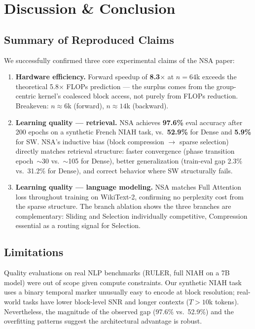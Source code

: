 \documentclass[10pt,twocolumn]{article}
\begin{document}
\FloatBarrier
\section{Discussion \& Conclusion}

\subsection{Summary of Reproduced Claims}

We successfully confirmed three core experimental claims of the NSA paper:

\begin{enumerate}[leftmargin=*,noitemsep,topsep=3pt]
\item \textbf{Hardware efficiency.}
  Forward speedup of \textbf{8.3$\times$} at $n=64$k exceeds the theoretical
  5.8$\times$ FLOPs prediction — the surplus comes from the group-centric kernel's
  coalesced block access, not purely from FLOPs reduction.
  Breakeven: $n \approx 6$k (forward), $n \approx 14$k (backward).

\item \textbf{Learning quality — retrieval.}
  NSA achieves \textbf{97.6\%} eval accuracy after 200 epochs on a synthetic
  French NIAH task, vs.\ \textbf{52.9\%} for Dense and \textbf{5.9\%} for SW.
  NSA's inductive bias (block compression $\to$ sparse selection)
  directly matches retrieval structure: faster convergence
  (phase transition epoch~$\sim$30 vs.~$\sim$105 for Dense),
  better generalization (train-eval gap 2.3\% vs.\ 31.2\% for Dense),
  and correct behavior where SW structurally fails.

\item \textbf{Learning quality — language modeling.}
  NSA matches Full Attention loss throughout training on WikiText-2,
  confirming no perplexity cost from the sparse structure.
  The branch ablation shows the three branches are complementary:
  Sliding and Selection individually competitive,
  Compression essential as a routing signal for Selection.
\end{enumerate}

\subsection{Limitations}

Quality evaluations on real NLP benchmarks (RULER, full NIAH on a 7B model)
were out of scope given compute constraints.
Our synthetic NIAH task uses a binary temporal marker unusually easy to encode
at block resolution; real-world tasks have lower block-level SNR and longer contexts
($T > 10$k tokens). Nevertheless, the magnitude of the observed gap (97.6\% vs.\ 52.9\%)
and the overfitting patterns suggest the architectural advantage is robust.
\end{document}
